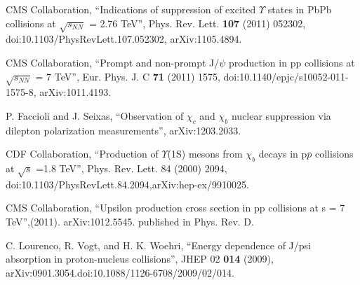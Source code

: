 \begin{thebibliography}{999}
 CMS Collaboration, ``Indications of suppression of excited $\Upsilon$ states in PbPb collisions at
$\surd{s_{NN}}$ = 2.76 TeV'', Phys. Rev. Lett. {\bf 107} (2011) 052302, doi:10.1103/PhysRevLett.107.052302, arXiv:1105.4894.

 CMS Collaboration, ``Prompt and non-prompt J/$\psi$ production in pp collisions at 
$\surd{s_{NN}}$ = 7 TeV'', Eur. Phys. J. C {\bf 71} (2011) 1575, doi:10.1140/epjc/s10052-011-1575-8, arXiv:1011.4193.

 P. Faccioli and J. Seixas, ``Observation of $\chi_c$ and $\chi_b$ nuclear suppression via dilepton
polarization measurements'', arXiv:1203.2033.

 CDF Collaboration, ``Production of $\Upsilon$(1S) mesons from $\chi_b$ decays in p$\overline{p}$ collisions at 
$\surd{s}$ =1.8 TeV'', Phys. Rev. Lett. 84 (2000) 2094, doi:10.1103/PhysRevLett.84.2094,arXiv:hep-ex/9910025.

 CMS Collaboration, ``Upsilon production cross section in pp collisions at s = 7 TeV'',(2011). arXiv:1012.5545.
published in Phys. Rev. D.

 C. Lourenco, R. Vogt, and H. K. Woehri, ``Energy dependence of J/psi absorption in
proton-nucleus collisions'', JHEP 02 {\bf 014} (2009), arXiv:0901.3054.doi:10.1088/1126-6708/2009/02/014.


\end{thebibliography}
